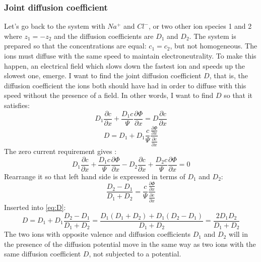 \documentclass{article}
\begin{document}
\subsubsection{Joint diffusion coefficient}\label{joint diffusion}
Let's go back to the system with $Na^+$ and $Cl^-$, or two other ion species 1 and 2 where $z_1 = -z_2$ and the diffusion coefficients are $D_1$ and $D_2$. The system is prepared so that the concentrations are equal: $c_1 = c_2$, but not homogeneous. The ions must diffuse with the same speed to maintain electroneutrality. To make this happen, an electrical field which slows down the fastest ion and speeds up the slowest one, emerge.  I want to find the joint diffusion coefficient $D$, that is, the diffusion coefficient the ions both should have had in order to diffuse with this speed without the presence of a field. In other words, I want to find $D$ so that it satisfies:
\begin{equation}
D_1 \frac{\partial c}{\partial x} + \frac{D_1 c}{\Psi}\frac{\partial \Phi}{\partial x} = D\frac{\partial c}{\partial x}
\end{equation} 
\begin{equation}\label{eq:D}
D = D_1 + D_1 \frac{c}{\Psi}\frac{\frac{\partial \Phi}{\partial x}}{\frac{\partial c}{\partial x}}
\end{equation}
The zero current requirement gives :
\begin{equation}
D_1 \frac{\partial c}{\partial x} + \frac{D_1 c}{\Psi}\frac{\partial \Phi}{\partial x} - D_2 \frac{\partial c}{\partial x} + \frac{D_2 c}{\Psi}\frac{\partial \Phi}{\partial x} = 0
\end{equation}
Rearrange it so that left hand side is expressed in terms of $D_1$ and $D_2$:
\begin{equation}
\frac{D_2 - D_1}{D_1 + D_2} = \frac{c}{\Psi}\frac{\frac{\partial \Phi}{\partial x}}{\frac{\partial c}{\partial x}}
\end{equation}
Inserted into \ref{eq:D}: 
\begin{equation}
D = D_1 +D_1 \frac{D_2 - D_1}{D_1 + D_2} = \frac{D_1(D_1 + D_2)+D_1(D_2-D_1)}{D_1+D_2} = \frac{2D_1D_2}{D_1+D_2}
\end{equation}
The two ions with opposite valence and diffusion coefficients $D_1$ and $D_2$ will in the presence of the diffusion potential move in the same way as two ions with the same diffusion coefficient $D$, not subjected to a potential. 
\end{document}
